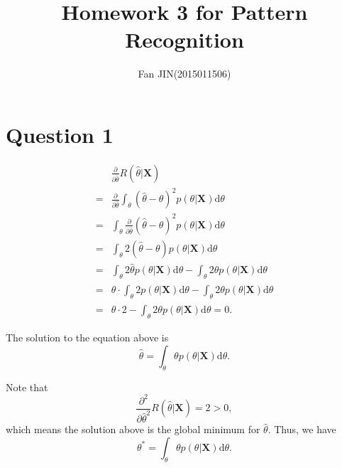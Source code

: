 \documentclass{article}
\begin{document}
\title{\textsf{Homework 3 for Pattern Recognition}}
\author{Fan JIN\quad (2015011506)}
\maketitle

\section*{Question 1}
{
    \[
    \begin{split}
        &   \frac{\partial}{\partial \hat{\theta}} R(\hat{\theta} | \bm{X}) \\
        =&  \frac{\partial}{\partial \hat{\theta}} \int_{\theta} {(\hat{\theta}-\theta)^2 p(\theta | \bm{X}) \mathrm{d}\theta} \\
        =&  \int_{\theta} {\frac{\partial}{\partial \hat{\theta}} (\hat{\theta}-\theta)^2 p(\theta | \bm{X}) \mathrm{d}\theta} \\
        =&  \int_{\theta} {2 (\hat{\theta}-\theta) p(\theta | \bm{X}) \mathrm{d}\theta} \\
        =&  \int_{\theta} {2 \hat{\theta} p(\theta | \bm{X}) \mathrm{d}\theta} - \int_{\theta} {2 \theta p(\theta | \bm{X}) \mathrm{d}\theta} \\
        =&  \hat{\theta} \cdot \int_{\theta} {2 p(\theta | \bm{X}) \mathrm{d}\theta} - \int_{\theta} {2 \theta p(\theta | \bm{X}) \mathrm{d}\theta} \\
        =&  \hat{\theta} \cdot 2 - \int_{\theta} {2 \theta p(\theta | \bm{X}) \mathrm{d}\theta} = 0.
    \end{split}
    \]

    The solution to the equation above is $$\hat{\theta} = \int_{\theta} {\theta p(\theta | \bm{X}) \mathrm{d}\theta}.$$

    Note that $$\frac{\partial^2}{\partial \hat{\theta}^2} R(\hat{\theta} | \bm{X}) = 2 > 0,$$ which means the solution above is the global minimum for $\hat{\theta}$. Thus, we have $$\theta^{*} = \int_{\theta} {\theta p(\theta | \bm{X}) \mathrm{d}\theta}.$$

}
\end{document}
